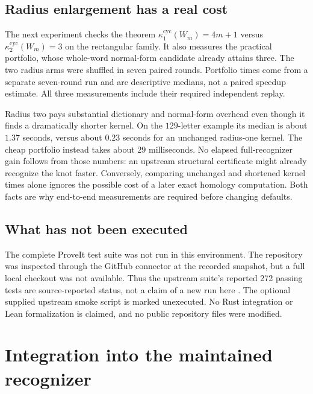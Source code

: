 \documentclass[11pt,a4paper]{article}
\theoremstyle{definition}\newtheorem{definition}[theorem]{Definition}
\theoremstyle{remark}\newtheorem{remark}[theorem]{Remark}
\newcommand{\kc}[1]{\kappa^{\mathrm{cyc}}_{#1}}
\begin{document}
\subsection{Radius enlargement has a real cost}
The next experiment checks the theorem $\kc{1}(W_m)=4m+1$ versus
$\kc{2}(W_m)=3$ on the rectangular family. It also measures the practical
portfolio, whose whole-word normal-form candidate already attains three.
The two radius arms were shuffled in seven paired rounds. Portfolio times
come from a separate seven-round run and are descriptive medians, not a
paired speedup estimate. All three measurements include their required
independent replay.

\begin{table}[ht]\centering\small

\caption{Rectangular-family outputs and median times in milliseconds.
The two kernel arms solve different optimization problems. The portfolio
returns a three-letter equal braid without constructing the larger target
query table.}
\end{table}

Radius two pays substantial dictionary and normal-form overhead even though
it finds a dramatically shorter kernel. On the $129$-letter example its
median is about $1.37$ seconds, versus about $0.23$ seconds for an unchanged
radius-one kernel. The cheap portfolio instead takes about $29$ milliseconds.
No elapsed full-recognizer gain follows from those numbers: an upstream
structural certificate might already recognize the knot faster. Conversely,
comparing unchanged and shortened kernel times alone ignores the possible
cost of a later exact homology computation. Both facts are why end-to-end
measurements are required before changing defaults.

\subsection{What has not been executed}
The complete ProveIt test suite was not run in this environment. The
repository was inspected through the GitHub connector at the recorded
snapshot, but a full local checkout was not available. Thus the upstream
suite's reported 272 passing tests are source-reported status, not a claim
of a new run here \cite{ProveItReadme}. The optional supplied upstream smoke
script is marked unexecuted. No Rust integration or Lean formalization is
claimed, and no public repository files were modified.

\section{Integration into the maintained recognizer}
\end{document}
